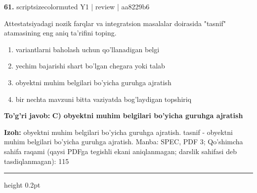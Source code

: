 \documentclass[10pt,a4paper]{article}
\begin{document}
{\bfseries\sffamily\color{ink} 61.} {scriptsizecolor{muted} Y1 | review | aa8229b6}
\par
Attestatsiyadagi nozik farqlar va integratsion masalalar doirasida "tasnif" atamasining eng aniq ta'rifini toping.
\begin{enumerate}[label=\Alph*),leftmargin=9mm]
\item variantlarni baholash uchun qo'llanadigan belgi
\item yechim bajarishi shart bo'lgan chegara yoki talab
\item obyektni muhim belgilari bo'yicha guruhga ajratish
\item bir nechta mavzuni bitta vaziyatda bog'laydigan topshiriq
\end{enumerate}
\begin{tcolorbox}[enhanced,breakable,colback=teal!4,colframe=teal!60!black,boxrule=0.45pt,arc=1.2mm,left=2.7mm,right=2.7mm,top=1.8mm,bottom=1.8mm,before skip=2mm,after skip=2mm]
{\bfseries\sffamily\color{teal}To'g'ri javob:} \textbf{C) obyektni muhim belgilari bo'yicha guruhga ajratish}
\par\smallskip
{\bfseries Izoh:} obyektni muhim belgilari bo'yicha guruhga ajratish. tasnif - obyektni muhim belgilari bo'yicha guruhga ajratish. Manba: SPEC, PDF 3; Qo'shimcha sahifa raqami (qaysi PDFga tegishli ekani aniqlanmagan; darslik sahifasi deb tasdiqlanmagan): 115
\end{tcolorbox}
\vspace{2mm}\hrule height 0.2pt\vspace{3mm}
\end{document}
